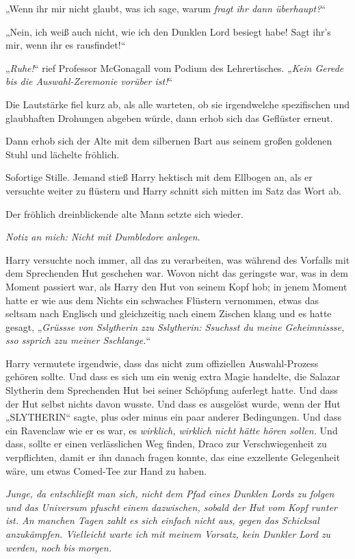 {„Wenn ihr mir nicht glaubt, was ich sage, warum \emph{fragt ihr dann überhaupt?}“

„Nein, ich weiß auch nicht, wie ich den Dunklen Lord besiegt habe! Sagt ihr's mir, wenn ihr es rausfindet!“

„\emph{Ruhe!}“ rief Professor McGonagall vom Podium des Lehrertisches. „\emph{Kein Gerede bis die Auswahl-Zeremonie vorüber ist!}“

Die Lautstärke fiel kurz ab, als alle warteten, ob sie irgendwelche spezifischen und glaubhaften Drohungen abgeben würde, dann erhob sich das Geflüster erneut.

Dann erhob sich der Alte mit dem silbernen Bart aus seinem großen goldenen Stuhl und lächelte fröhlich.

Sofortige Stille. Jemand stieß Harry hektisch mit dem Ellbogen an, als er versuchte weiter zu flüstern und Harry schnitt sich mitten im Satz das Wort ab.

Der fröhlich dreinblickende alte Mann setzte sich wieder.

\emph{Notiz an mich: Nicht mit Dumbledore anlegen.}

Harry versuchte noch immer, all das zu verarbeiten, was während des Vorfalls mit dem Sprechenden Hut geschehen war. Wovon nicht das geringste war, was in dem Moment passiert war, als Harry den Hut von seinem Kopf hob; in jenem Moment hatte er wie aus dem Nichts ein schwaches Flüstern vernommen, etwas das seltsam nach Englisch und gleichzeitig nach einem Zischen klang und es hatte gesagt, „\emph{Grüssse von Sslytherin zzu Sslytherin: Ssuchsst du meine Geheimnissse, sso ssprich zzu meiner Sschlange.}“

Harry vermutete irgendwie, dass das nicht zum offiziellen Auswahl-Prozess gehören sollte. Und dass es sich um ein wenig extra Magie handelte, die Salazar Slytherin dem Sprechenden Hut bei seiner Schöpfung auferlegt hatte. Und dass der Hut selbst nichts davon wusste. Und dass es ausgelöst wurde, wenn der Hut „SLYTHERIN“ sagte, plus oder minus ein paar anderer Bedingungen. Und dass ein Ravenclaw wie er es war, es \emph{wirklich, wirklich nicht hätte hören sollen.} Und dass, sollte er einen verlässlichen Weg finden, Draco zur Verschwiegenheit zu verpflichten, damit er ihn danach fragen konnte, das eine exzellente Gelegenheit wäre, um etwas Comed-Tee zur Hand zu haben.

\emph{Junge, da entschließt man sich, nicht dem Pfad eines Dunklen Lords zu folgen und das Universum pfuscht einem dazwischen, sobald der Hut vom} \emph{Kopf runter ist. An manchen Tagen zahlt es sich einfach nicht aus, gegen das Schicksal anzukämpfen. Vielleicht warte ich mit meinem Vorsatz, kein Dunkler Lord zu werden, noch bis morgen.}

}
